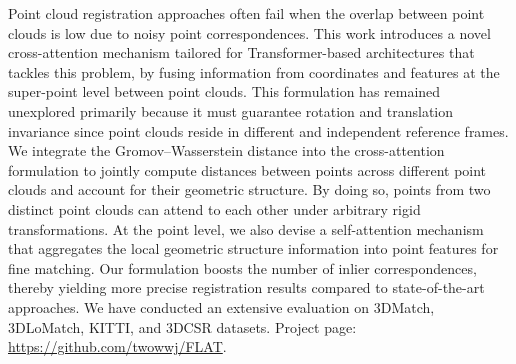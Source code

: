 Point cloud registration approaches often fail when the overlap between point clouds is low due to noisy point correspondences. 
This work introduces a novel cross-attention mechanism tailored for Transformer-based architectures that tackles this problem, by fusing information from coordinates and features at the super-point level between point clouds.
This formulation has remained unexplored primarily because it must guarantee rotation and translation invariance since point clouds reside in different and independent reference frames.
We integrate the Gromov–Wasserstein distance into the cross-attention formulation to jointly compute distances between points across different point clouds and account for their geometric structure.
By doing so, points from two distinct point clouds can attend to each other under arbitrary rigid transformations.
At the point level, we also devise a self-attention mechanism that aggregates the local geometric structure information into point features for fine matching. 
Our formulation boosts the number of inlier correspondences, thereby yielding more precise registration results compared to state-of-the-art approaches. 
We have conducted an extensive evaluation on 3DMatch, 3DLoMatch, KITTI, and 3DCSR datasets. 
Project page: \url{https://github.com/twowwj/FLAT}.
